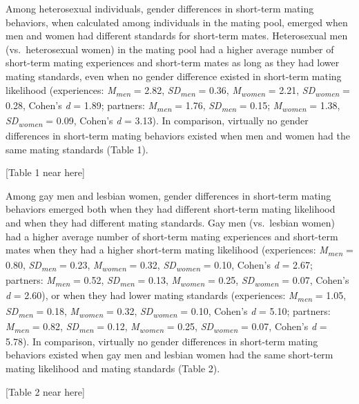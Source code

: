 \documentclass[
  12pt,
]{article}
\begin{document}
Among heterosexual individuals, gender differences in short-term mating
behaviors, when calculated among individuals in the mating pool, emerged
when men and women had different standards for short-term mates.
Heterosexual men (vs.~heterosexual women) in the mating pool had a
higher average number of short-term mating experiences and short-term
mates as long as they had lower mating standards, even when no gender
difference existed in short-term mating likelihood (experiences:
\emph{M\textsubscript{men}} = 2.82, \emph{SD\textsubscript{men}} = 0.36,
\emph{M\textsubscript{women}} = 2.21, \emph{SD\textsubscript{women}} =
0.28, Cohen's \emph{d} = 1.89; partners: \emph{M\textsubscript{men}} =
1.76, \emph{SD\textsubscript{men}} = 0.15; \emph{M\textsubscript{women}}
= 1.38, \emph{SD\textsubscript{women}} = 0.09, Cohen's \emph{d} = 3.13).
In comparison, virtually no gender differences in short-term mating
behaviors existed when men and women had the same mating standards
(Table 1).

{[}Table 1 near here{]}

Among gay men and lesbian women, gender differences in short-term mating
behaviors emerged both when they had different short-term mating
likelihood and when they had different mating standards. Gay men
(vs.~lesbian women) had a higher average number of short-term mating
experiences and short-term mates when they had a higher short-term
mating likelihood (experiences: \emph{M\textsubscript{men}} = 0.80,
\emph{SD\textsubscript{men}} = 0.23, \emph{M\textsubscript{women}} =
0.32, \emph{SD\textsubscript{women}} = 0.10, Cohen's \emph{d} = 2.67;
partners: \emph{M\textsubscript{men}} = 0.52,
\emph{SD\textsubscript{men}} = 0.13, \emph{M\textsubscript{women}} =
0.25, \emph{SD\textsubscript{women}} = 0.07, Cohen's \emph{d} = 2.60),
or when they had lower mating standards (experiences:
\emph{M\textsubscript{men}} = 1.05, \emph{SD\textsubscript{men}} = 0.18,
\emph{M\textsubscript{women}} = 0.32, \emph{SD\textsubscript{women}} =
0.10, Cohen's \emph{d} = 5.10; partners: \emph{M\textsubscript{men}} =
0.82, \emph{SD\textsubscript{men}} = 0.12, \emph{M\textsubscript{women}}
= 0.25, \emph{SD\textsubscript{women}} = 0.07, Cohen's \emph{d} = 5.78).
In comparison, virtually no gender differences in short-term mating
behaviors existed when gay men and lesbian women had the same short-term
mating likelihood and mating standards (Table 2).

{[}Table 2 near here{]}

\vspace{5mm}
\end{document}
